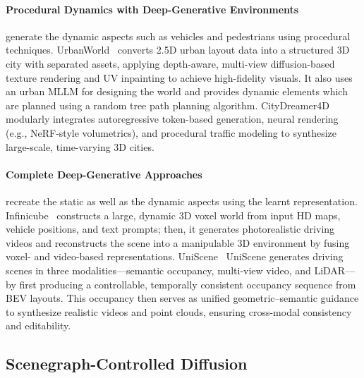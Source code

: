 \documentclass{article}
\begin{document}
\paragraph{Procedural Dynamics with Deep-Generative Environments} generate the dynamic aspects such as vehicles and pedestrians using procedural techniques. UrbanWorld~\cite{shang2024urbanworld} converts 2.5D urban layout data into a structured 3D city with separated assets, applying depth-aware, multi-view diffusion-based texture rendering and UV inpainting to achieve high-fidelity visuals. It also uses an urban MLLM for designing the world and provides dynamic elements which are planned using a random tree path planning algorithm. CityDreamer4D~\cite{xie2024citydreamer} modularly integrates autoregressive token-based generation, neural rendering (e.g., NeRF-style volumetrics), and procedural traffic modeling to synthesize large-scale, time-varying 3D cities.

\paragraph{Complete Deep-Generative Approaches} recreate the static as well as the dynamic aspects using the learnt representation. Infinicube~\cite{lu2024infinicube} constructs a large, dynamic 3D voxel world from input HD maps, vehicle positions, and text prompts; then, it generates photorealistic driving videos and reconstructs the scene into a manipulable 3D environment by fusing voxel- and video-based representations. UniScene~\cite{li2025uniscene} UniScene generates driving scenes in three modalities—semantic occupancy, multi-view video, and LiDAR—by first producing a controllable, temporally consistent occupancy sequence from BEV layouts. This occupancy then serves as unified geometric–semantic guidance to synthesize realistic videos and point clouds, ensuring cross-modal consistency and editability.

\subsection{Scenegraph-Controlled Diffusion}
\end{document}
